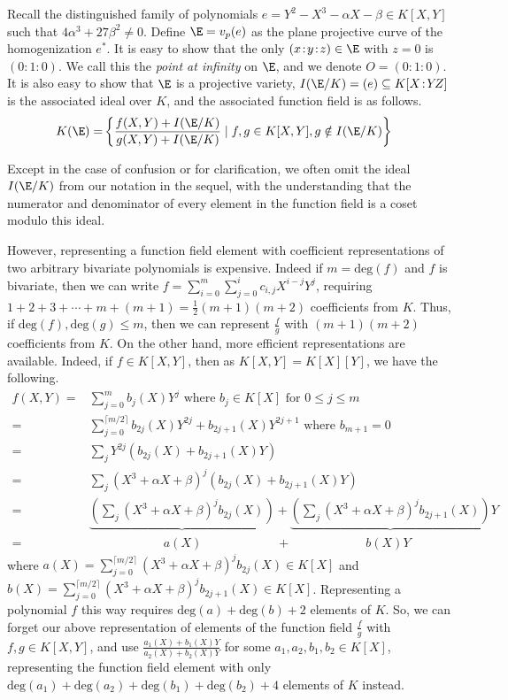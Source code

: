 \documentclass[11pt,letterpaper]{article}
\theoremstyle{definition}
\newcommand{\6}{\mathbf}
\newcommand{\7}{\mathcal}
\begin{document}
Recall the distinguished family of polynomials $e = Y^2 - X^3 - \alpha X - \beta \in K[X,Y]$ such that $4\alpha^3 + 27\beta^2 \neq 0$. Define $\E=v_p(e)$ as the plane projective curve of the homogenization $e^*$. It is easy to show that the only $(x\!:\!y\!:\!z) \in \E$ with $z=0$ is $(0\!:\!1\!:\!0)$.  We call this the \textit{point at infinity} on $\E$, and we denote $O = (0\!:\!1\!:\!0)$. It is also easy to show that $\E$ is a projective variety, $I(\E/K) = (e) \subseteq K[X\!:\!Y\!Z]$ is the associated ideal over $K$, and the associated function field is as follows.
\begin{align}
K(\E) =& \left\{\frac{f(X,Y) + I(\E/K)}{g(X,Y) + I(\E/K)} \mid f, g \in K[X,Y], g \notin I(\E/K)\right\}
\end{align}

Except in the case of confusion or for clarification, we often omit the ideal $I(\E/K)$ from our notation in the sequel, with the understanding that the numerator and denominator of every element in the function field is a coset modulo this ideal.

However, representing a function field element with coefficient representations of two arbitrary bivariate polynomials is expensive. Indeed if $m = \text{deg}(f)$ and $f$ is bivariate, then we can write $f = \sum_{i=0}^{m} \sum_{j=0}^{i} c_{i,j}X^{i-j}Y^j$, requiring $1 + 2 + 3 + \cdots + m + (m+1) = \frac{1}{2}(m+1)(m+2)$ coefficients from $K$. Thus, if $\text{deg}(f), \text{deg}(g) \leq m$, then we can represent $\frac{f}{g}$ with $(m+1)(m+2)$ coefficients from $K$. On the other hand, more efficient representations are available. Indeed, if $f \in K[X,Y]$, then as $K[X,Y] = K[X][Y]$, we have the following.
\begin{align}
f(X,Y)
=& \sum_{j=0}^{m} b_{j}(X)Y^j\text{ where }b_j \in K[X]\text{ for }0 \leq j \leq m  \\
=& \sum_{j=0}^{\lceil m/2\rceil} b_{2j}(X)Y^{2j} + b_{2j+1}(X)Y^{2j+1} \text{ where }b_{m+1}=0\\
=& \sum_{j} Y^{2j}\left(b_{2j}(X) + b_{2j+1}(X)Y\right)\\
=& \sum_j \left(X^3 + \alpha X + \beta\right)^j\left(b_{2j}(X) + b_{2j+1}(X)Y\right) \\
=& \underbrace{\left(\sum_j \left(X^3 + \alpha X + \beta\right)^jb_{2j}(X)\right)}{} + \underbrace{\left(\sum_j \left(X^3 + \alpha X + \beta\right)^jb_{2j+1}(X)\right)}{}Y \\
=& \quad \quad \quad \quad \quad \quad a(X)  \quad \quad \quad \quad \quad \quad + \quad \quad \quad \quad \quad \quad b(X)Y
\end{align} where $a(X) = \sum_{j=0}^{\lceil m/2\rceil} (X^3 + \alpha X + \beta)^j b_{2j}(X) \in K[X]$ and $b(X) = \sum_{j=0}^{\lceil m/2\rceil} (X^3 + \alpha X + \beta)^j b_{2j+1}(X) \in K[X]$. Representing a polynomial $f$ this way requires $\text{deg}(a) + \text{deg}(b)+2$ elements of $K$. So, we can forget our above representation of elements of the function field $\frac{f}{g}$ with $f, g \in K[X,Y]$, and use $\frac{a_1(X) + b_1(X)Y}{a_2(X) + b_2(X)Y}$ for some $a_1, a_2, b_1, b_2 \in K\left[X\right]$, representing the function field element with only $\text{deg}(a_1)+\text{deg}(a_2)+\text{deg}(b_1)+\text{deg}(b_2)+4$ elements of $K$ instead. 
\end{document}
